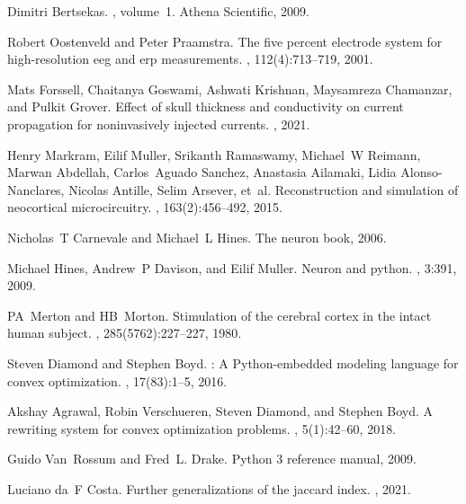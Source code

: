 \begin{thebibliography}{10}
Dimitri Bertsekas.
, volume~1.
\newblock Athena Scientific, 2009.

Robert Oostenveld and Peter Praamstra.
\newblock The five percent electrode system for high-resolution eeg and erp measurements.
, 112(4):713--719, 2001.

Mats Forssell, Chaitanya Goswami, Ashwati Krishnan, Maysamreza Chamanzar, and Pulkit Grover.
\newblock Effect of skull thickness and conductivity on current propagation for noninvasively injected currents.
, 2021.

Henry Markram, Eilif Muller, Srikanth Ramaswamy, Michael~W Reimann, Marwan Abdellah, Carlos~Aguado Sanchez, Anastasia Ailamaki, Lidia Alonso-Nanclares, Nicolas Antille, Selim Arsever, et~al.
\newblock Reconstruction and simulation of neocortical microcircuitry.
, 163(2):456--492, 2015.

Nicholas~T Carnevale and Michael~L Hines.
\newblock The neuron book, 2006.

Michael Hines, Andrew~P Davison, and Eilif Muller.
\newblock Neuron and python.
, 3:391, 2009.

PA~Merton and HB~Morton.
\newblock Stimulation of the cerebral cortex in the intact human subject.
, 285(5762):227--227, 1980.

Steven Diamond and Stephen Boyd.
: {A} {P}ython-embedded modeling language for convex optimization.
, 17(83):1--5, 2016.

Akshay Agrawal, Robin Verschueren, Steven Diamond, and Stephen Boyd.
\newblock A rewriting system for convex optimization problems.
, 5(1):42--60, 2018.

Guido Van~Rossum and Fred~L. Drake.
\newblock Python 3 reference manual, 2009.

Luciano da~F Costa.
\newblock Further generalizations of the jaccard index.
, 2021.

\end{thebibliography}
